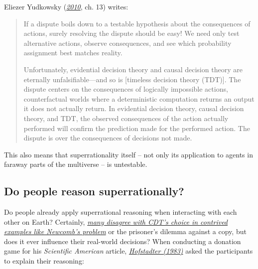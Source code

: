 Eliezer Yudkowsky
(\href{https://intelligence.org/files/TDT.pdf}{\emph{2010}}, ch. 13)
writes:

\begin{quote}
If a dispute boils down to a testable hypothesis about the consequences
of actions, surely resolving the dispute should be easy! We need only
test alternative actions, observe consequences, and see which
probability assignment best matches reality.

Unfortunately, evidential decision theory and causal decision theory are
eternally unfalsifiable---and so is {[}timeless decision theory
(TDT){]}. The dispute centers on the consequences of logically
impossible actions, counterfactual worlds where a deterministic
computation returns an output it does not actually return. In evidential
decision theory, causal decision theory, and TDT, the observed
consequences of the action actually performed will confirm the
prediction made for the performed action. The dispute is over the
consequences of decisions not made.
\end{quote}

This also means that superrationality itself -- not only its application
to agents in faraway parts of the multiverse -- is untestable.

\hypertarget{do-people-reason-superrationally}{\subsection{Do people
reason superrationally?}\label{do-people-reason-superrationally}}

Do people already apply superrational reasoning when interacting with
each other on Earth? Certainly,
\href{https://casparoesterheld.com/2017/06/27/a-survey-of-polls-on-newcombs-problem/}{\emph{many
disagree with CDT's choice in contrived examples like Newcomb's
problem}} or the prisoner's dilemma against a copy, but does it ever
influence their real-world decisions? When conducting a donation game
for his \emph{Scientific American} article,
\href{https://www.gwern.net/docs/1985-hofstadter\#dilemmas-for-superrational-thinkers-leading-up-to-a-luring-lottery}{\emph{Hofstadter
(1983)}} asked the participants to explain their reasoning:

